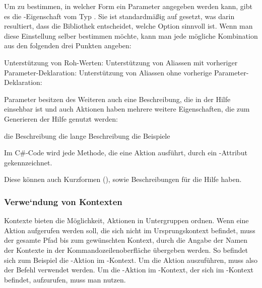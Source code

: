 Um zu bestimmen, in welcher Form ein Parameter angegeben werden kann, gibt es die -Eigenschaft vom Typ .
Sie ist standardmäßig auf  gesetzt, was darin resultiert, dass die Bibliothek entscheidet, welche Option sinnvoll ist.
Wenn man diese Einstellung selber bestimmen möchte, kann man jede mögliche Kombination aus den folgenden drei Punkten angeben:
\begin{outline}
 \1 Unterstützung von Roh-Werten: 
 \1 Unterstützung von Aliassen mit vorheriger Parameter-Deklaration: 
 \1 Unterstützung von Aliassen ohne vorherige Parameter-Deklaration: 
\end{outline}
Parameter besitzen des Weiteren auch eine Beschreibung, die in der Hilfe einsehbar ist und auch Aktionen haben mehrere weitere Eigenschaften,
die zum Generieren der Hilfe genutzt werden:
\begin{outline}
 \1 die Beschreibung
 \1 die lange Beschreibung
 \1 die Beispiele
\end{outline}

Im C\#-Code wird jede Methode, die eine Aktion ausführt, durch ein -Attribut gekennzeichnet.

Diese können auch Kurzformen (), sowie Beschreibungen für die Hilfe haben.

\subsubsection{Verwe`ndung von Kontexten}
Kontexte bieten die Möglichkeit, Aktionen in Untergruppen ordnen.
Wenn eine Aktion aufgerufen werden soll, die sich nicht im Ursprungskontext befindet,
muss der gesamte Pfad bis zum gewünschten Kontext, durch die Angabe der Namen der Kontexte in der Kommandozeilenoberfläche übergeben werden.
So befindet sich zum Beispiel die -Aktion im -Kontext.
Um die Aktion auszuführen, muss also der Befehl  verwendet werden.
Um die -Aktion im -Kontext, der sich im -Kontext befindet,
aufzurufen, muss man  nutzen.

